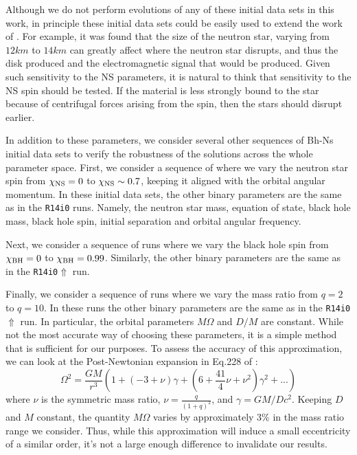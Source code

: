 Although we do not perform evolutions of any of these initial data sets in this
work, in principle these initial data sets could be easily used to
extend the work of \cite{Foucart:2013a}. For example, it was found
that the size of the neutron star, varying from $12km$ to $14km$ can
greatly affect where the neutron star disrupts, and thus the disk
produced and the electromagnetic signal that would be produced. Given
such sensitivity to the NS parameters, it is natural to think that
sensitivity to the NS spin should be tested. If the material is less
strongly bound to the star because of centrifugal forces arising from
the spin, then the stars should disrupt earlier.


In addition to these parameters, we consider several other sequences
of Bh-Ns initial data sets to verify the robustness of the solutions across
the whole parameter space. First, we consider a sequence of where we vary the neutron star spin from
$\chi_{\rm NS}=0$ to $\chi_{\rm NS}\sim0.7$, keeping it aligned with the orbital angular momentum. In these initial data sets, the other binary parameters are the same
as in the {\tt R14i0} runs. Namely, the neutron star mass, equation of state, black hole mass, black hole spin, initial separation and orbital angular frequency.

Next, we consider a sequence of runs where we vary the black hole spin from $\chi_{\rm BH}=0$ to $\chi_{\rm BH}=0.99$. Similarly, the other binary parameters are the same as in the {\tt R14i0$\Uparrow$} run.

Finally, we consider a sequence of runs where we vary the mass ratio from $q=2$ to $q=10$. In these runs the other binary parameters are the same as in the {\tt R14i0$\Uparrow$} run. In particular, the orbital parameters $M\Omega$ and $D/M$ are constant. While not the most accurate way of choosing these parameters, it is a simple method that is sufficient for our purposes. To assess the accuracy of this approximation, we can look at the Post-Newtonian expansion in Eq.228 of \cite{Blanchet2006}:
\begin{equation}
\Omega^2=\frac{GM}{r^3}\left(1+(-3+\nu)\gamma+\left(6+\frac{41}{4}\nu+\nu^2\right)\gamma^2+...\right)
\end{equation}
where $\nu$ is the symmetric mass ratio, $\nu=\frac{q}{(1+q)^2}$, and $\gamma=GM/Dc^2$. Keeping $D$ and $M$ constant, the quantity $M\Omega$ varies by approximately 3\% in the mass ratio range we consider.
Thus, while this approximation will induce a small eccentricity of a similar order, it's not a large enough difference to invalidate our results.

